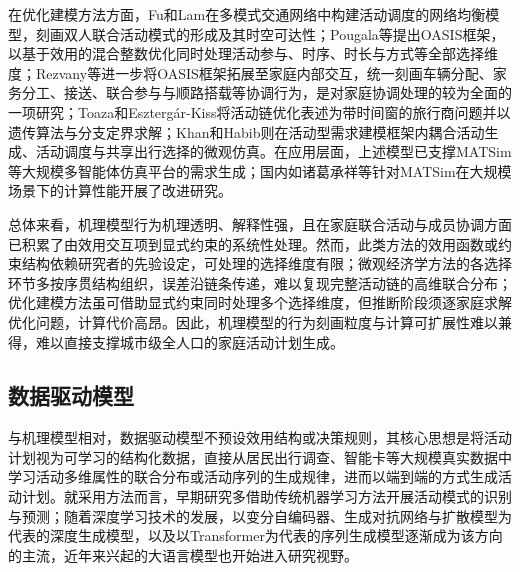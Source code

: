 在优化建模方法方面，Fu和Lam\citep{fuModellingJointActivitytravel2018,fuMaximizingSpacetimeAccessibility2022}在多模式交通网络中构建活动调度的网络均衡模型，刻画双人联合活动模式的形成及其时空可达性；Pougala等\citep{pougalaOASISOptimisationbasedActivity2023}提出OASIS框架，以基于效用的混合整数优化同时处理活动参与、时序、时长与方式等全部选择维度；Rezvany等\citep{rezvanySimulatingIntrahouseholdInteractions2023}进一步将OASIS框架拓展至家庭内部交互，统一刻画车辆分配、家务分工、接送、联合参与与顺路搭载等协调行为，是对家庭协调处理的较为全面的一项研究；Toaza和Eszterg\'ar-Kiss\citep{toazaAssessmentActivityScheduling2024}将活动链优化表述为带时间窗的旅行商问题并以遗传算法与分支定界求解；Khan和Habib\citep{khanMicrosimulationActivityGeneration2023}则在活动型需求建模框架内耦合活动生成、活动调度与共享出行选择的微观仿真。在应用层面，上述模型已支撑MATSim等大规模多智能体仿真平台的需求生成\citep{balmerMATSimTArchitectureSimulation2009}；国内如诸葛承祥等\citep{zhugeImprovementMATSimComputing2021}针对MATSim在大规模场景下的计算性能开展了改进研究。

总体来看，机理模型行为机理透明、解释性强，且在家庭联合活动与成员协调方面已积累了由效用交互项到显式约束的系统性处理。然而，此类方法的效用函数或约束结构依赖研究者的先验设定，可处理的选择维度有限；微观经济学方法的各选择环节多按序贯结构组织，误差沿链条传递，难以复现完整活动链的高维联合分布\citep{timmermansModelingHouseholdActivity2009,rasouliActivitybasedModelsTravel2014}；优化建模方法虽可借助显式约束同时处理多个选择维度，但推断阶段须逐家庭求解优化问题，计算代价高昂。因此，机理模型的行为刻画粒度与计算可扩展性难以兼得，难以直接支撑城市级全人口的家庭活动计划生成。

\subsection{数据驱动模型}\label{subsec.review.actgen.dl}

与机理模型相对，数据驱动模型不预设效用结构或决策规则，其核心思想是将活动计划视为可学习的结构化数据，直接从居民出行调查、智能卡等大规模真实数据中学习活动多维属性的联合分布或活动序列的生成规律，进而以端到端的方式生成活动计划。就采用方法而言，早期研究多借助传统机器学习方法开展活动模式的识别与预测\citep{allahviranlooDailyActivityPattern2013,hafeziEnsembleLearningActivity2021}；随着深度学习技术的发展，以变分自编码器、生成对抗网络与扩散模型为代表的深度生成模型，以及以Transformer为代表的序列生成模型逐渐成为该方向的主流，近年来兴起的大语言模型也开始进入研究视野。

